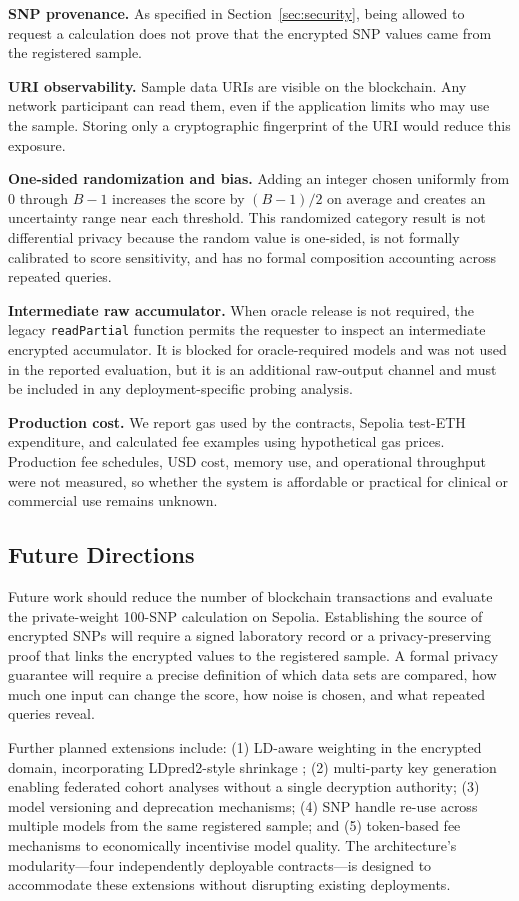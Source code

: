 \documentclass[10pt]{article}
\begin{document}
\textbf{SNP provenance.}
As specified in Section~\ref{sec:security}, being allowed to request a calculation does
not prove that the encrypted SNP values came from the registered sample.

\textbf{URI observability.}
Sample data URIs are visible on the blockchain.  Any network participant can read them,
even if the application limits who may use the sample.  Storing only a cryptographic
fingerprint of the URI would reduce this exposure.

\textbf{One-sided randomization and bias.}
Adding an integer chosen uniformly from $0$ through $B-1$ increases the score by
$(B-1)/2$ on average and creates an uncertainty range near each threshold.  This
randomized category result is not
differential privacy because the random value is one-sided, is not formally calibrated
to score sensitivity, and has no formal composition accounting across repeated queries.

\textbf{Intermediate raw accumulator.}
When oracle release is not required, the legacy \texttt{readPartial} function permits the
requester to inspect an intermediate encrypted accumulator.  It is blocked for
oracle-required models and was not used in the reported evaluation, but it is an additional
raw-output channel and must be included in any deployment-specific probing analysis.

\textbf{Production cost.}
We report gas used by the contracts, Sepolia test-ETH expenditure, and calculated fee
examples using hypothetical gas prices.  Production fee schedules, USD cost, memory
use, and operational throughput were not measured, so whether the system is affordable
or practical for clinical or commercial use remains unknown.

\subsection{Future Directions}

Future work should reduce the number of blockchain transactions and evaluate the
private-weight 100-SNP calculation on Sepolia.  Establishing the source of encrypted
SNPs will require a signed laboratory record or a privacy-preserving proof that links
the encrypted values to the registered sample.  A formal privacy guarantee will require
a precise definition of which data sets are compared, how much one input can change the
score, how noise is chosen, and what repeated queries reveal.

Further planned extensions include: (1) LD-aware weighting in the encrypted domain,
incorporating LDpred2-style shrinkage \citep{prive2020ldpred2}; (2) multi-party key
generation enabling federated cohort analyses without a single decryption authority;
(3) model versioning and deprecation mechanisms; (4) SNP handle re-use across
multiple models from the same registered sample; and (5) token-based fee mechanisms
to economically incentivise model quality.  The architecture's modularity---four
independently deployable contracts---is designed to accommodate these extensions
without disrupting existing deployments.
\end{document}
